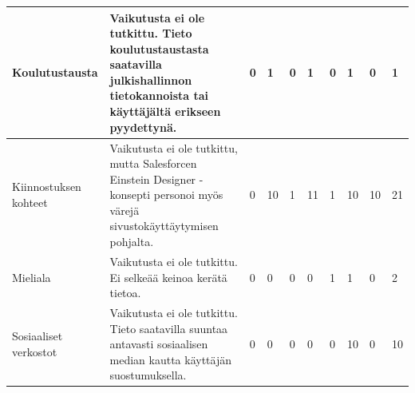 \documentclass[finnish, 12pt, a4paper, elec, utf8, a-1b, online]{aaltothesis}
\begin{document}
{\begin{longtable}{p{2.5cm}|p{6cm}|p{0.5cm}p{0.5cm}p{0.5cm}|p{0.5cm}|p{0.5cm}p{0.5cm}p{0.5cm}|p{0.5cm}|}
    \midrule
    Koulutustausta                         & Vaikutusta ei ole tutkittu. Tieto koulutustaustasta saatavilla julkishallinnon tietokannoista tai käyttäjältä erikseen pyydettynä.                                                                                                                                                                                   & 0                                          & 1                                   & 0                                      & 1                            & 0                                               & 1                                         & 0                                         & 1                            \\
    \midrule
    Kiinnostuksen kohteet                  & Vaikutusta ei ole tutkittu, mutta Salesforcen Einstein Designer -konsepti personoi myös värejä sivustokäyttäytymisen pohjalta.                                                                                                                                                                                       & 0                                          & 10                                  & 1                                      & 11                           & 1                                               & 10                                        & 10                                        & 21                           \\
    \midrule
    Mieliala                               & Vaikutusta ei ole tutkittu. Ei selkeää keinoa kerätä tietoa.                                                                                                                                                                                                                                                         & 0                                          & 0                                   & 0                                      & 0                            & 1                                               & 1                                         & 0                                         & 2                            \\
    \midrule
    Sosiaaliset verkostot                  & Vaikutusta ei ole tutkittu. Tieto saatavilla suuntaa antavasti sosiaalisen median kautta käyttäjän suostumuksella.                                                                                                                                                                                                   & 0                                          & 0                                   & 0                                      & 0                            & 0                                               & 10                                        & 0                                         & 10                           \\

\end{longtable}}
\end{document}
